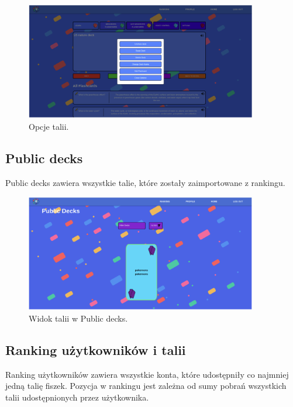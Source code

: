 \begin{figure}[H]
    \centering
    \includegraphics[width=0.9\textwidth]{chapters/chapter_10/images_web/web_settings}
    \caption{Opcje talii.}
    \label{img:web_settings}
\end{figure}


\subsection{Public decks}
Public decks zawiera wszystkie talie, które zostały zaimportowane z rankingu.


\begin{figure}[H]
    \centering
    \includegraphics[width=0.9\textwidth]{chapters/chapter_10/images_web/web_public_decks}
    \caption{Widok talii w Public decks.}
    \label{img:web_public_decks}
\end{figure}


\subsection{Ranking użytkowników i talii}
Ranking użytkowników zawiera wszystkie konta, które udostępniły co najmniej jedną talię fiszek. Pozycja w rankingu jest zależna od sumy pobrań wszystkich talii udostępnionych przez użytkownika.


